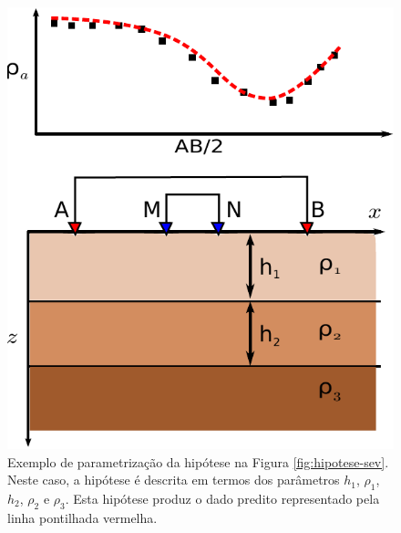 \begin{figure}
    \centering
    \includegraphics[scale=1]{figs/params-sev}
    \caption{Exemplo de parametrização da hipótese na Figura
    \ref{fig:hipotese-sev}. Neste caso, a hipótese é descrita em termos
    dos parâmetros $h_1$, $\rho_1$, $h_2$, $\rho_2$ e $\rho_3$.
    Esta hipótese produz o dado predito
    representado pela linha pontilhada vermelha.}
    \label{fig:params-sev}
\end{figure}
